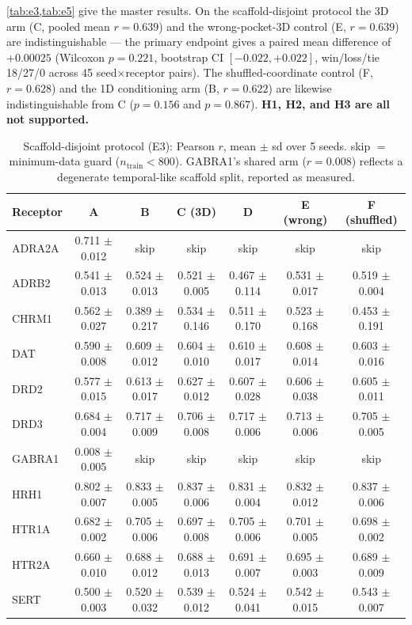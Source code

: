 \documentclass[11pt]{article}
\begin{document}
\cref{tab:e3,tab:e5} give the master results. On the scaffold-disjoint
protocol the 3D arm (C, pooled mean $r=0.639$) and the wrong-pocket-3D
control (E, $r=0.639$) are indistinguishable --- the primary endpoint
gives a paired mean difference of $+0.00025$ (Wilcoxon $p=0.221$,
bootstrap CI $[-0.022, +0.022]$, win/loss/tie 18/27/0 across 45
seed$\times$receptor pairs). The shuffled-coordinate control (F,
$r=0.628$) and the 1D conditioning arm (B, $r=0.622$) are likewise
indistinguishable from C ($p=0.156$ and $p=0.867$). \textbf{H1, H2, and
H3 are all not supported.}

\begin{table}[t]
\centering\small
\caption{Scaffold-disjoint protocol (E3): Pearson $r$, mean $\pm$ sd over
5 seeds. skip $=$ minimum-data guard ($n_{\text{train}}<800$). GABRA1's
shared arm ($r=0.008$) reflects a degenerate temporal-like scaffold
split, reported as measured.}
\label{tab:e3}
\begin{tabular}{lcccccc}
\toprule
Receptor & A & B & C (3D) & D & E (wrong) & F (shuffled) \\
\midrule
ADRA2A & 0.711 $\pm$ 0.012 & skip & skip & skip & skip & skip \\
ADRB2 & 0.541 $\pm$ 0.013 & 0.524 $\pm$ 0.013 & 0.521 $\pm$ 0.005 & 0.467 $\pm$ 0.114 & 0.531 $\pm$ 0.017 & 0.519 $\pm$ 0.004 \\
CHRM1 & 0.562 $\pm$ 0.027 & 0.389 $\pm$ 0.217 & 0.534 $\pm$ 0.146 & 0.511 $\pm$ 0.170 & 0.523 $\pm$ 0.168 & 0.453 $\pm$ 0.191 \\
DAT & 0.590 $\pm$ 0.008 & 0.609 $\pm$ 0.012 & 0.604 $\pm$ 0.010 & 0.610 $\pm$ 0.017 & 0.608 $\pm$ 0.014 & 0.603 $\pm$ 0.016 \\
DRD2 & 0.577 $\pm$ 0.015 & 0.613 $\pm$ 0.017 & 0.627 $\pm$ 0.012 & 0.607 $\pm$ 0.028 & 0.606 $\pm$ 0.038 & 0.605 $\pm$ 0.011 \\
DRD3 & 0.684 $\pm$ 0.004 & 0.717 $\pm$ 0.009 & 0.706 $\pm$ 0.008 & 0.717 $\pm$ 0.006 & 0.713 $\pm$ 0.006 & 0.705 $\pm$ 0.005 \\
GABRA1 & 0.008 $\pm$ 0.005 & skip & skip & skip & skip & skip \\
HRH1 & 0.802 $\pm$ 0.007 & 0.833 $\pm$ 0.005 & 0.837 $\pm$ 0.006 & 0.831 $\pm$ 0.004 & 0.832 $\pm$ 0.012 & 0.837 $\pm$ 0.006 \\
HTR1A & 0.682 $\pm$ 0.002 & 0.705 $\pm$ 0.006 & 0.697 $\pm$ 0.008 & 0.705 $\pm$ 0.006 & 0.701 $\pm$ 0.005 & 0.698 $\pm$ 0.002 \\
HTR2A & 0.660 $\pm$ 0.010 & 0.688 $\pm$ 0.012 & 0.688 $\pm$ 0.013 & 0.691 $\pm$ 0.007 & 0.695 $\pm$ 0.003 & 0.689 $\pm$ 0.009 \\
SERT & 0.500 $\pm$ 0.003 & 0.520 $\pm$ 0.032 & 0.539 $\pm$ 0.012 & 0.524 $\pm$ 0.041 & 0.542 $\pm$ 0.015 & 0.543 $\pm$ 0.007 \\
\bottomrule
\end{tabular}
\end{table}
\end{document}
